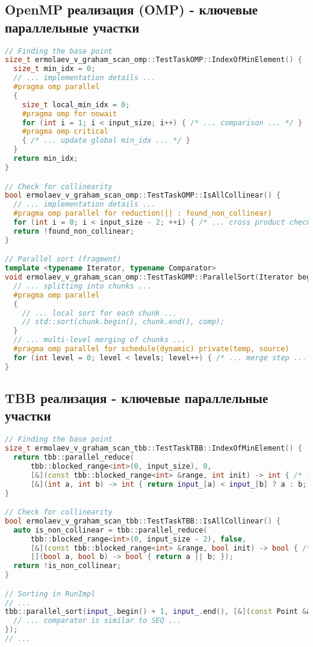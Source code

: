 \documentclass[12pt]{article}
\begin{document}
\subsection{OpenMP реализация (OMP) - ключевые параллельные участки}
\begin{lstlisting}[language=C++]
// Finding the base point
size_t ermolaev_v_graham_scan_omp::TestTaskOMP::IndexOfMinElement() {
  size_t min_idx = 0;
  // ... implementation details ...
  #pragma omp parallel
  {
    size_t local_min_idx = 0;
    #pragma omp for nowait
    for (int i = 1; i < input_size; i++) { /* ... comparison ... */ }
    #pragma omp critical
    { /* ... update global min_idx ... */ }
  }
  return min_idx;
}

// Check for collinearity
bool ermolaev_v_graham_scan_omp::TestTaskOMP::IsAllCollinear() {
  // ... implementation details ...
  #pragma omp parallel for reduction(|| : found_non_collinear)
  for (int i = 0; i < input_size - 2; ++i) { /* ... cross product check ... */ }
  return !found_non_collinear;
}

// Parallel sort (fragment)
template <typename Iterator, typename Comparator>
void ermolaev_v_graham_scan_omp::TestTaskOMP::ParallelSort(Iterator begin, Iterator end, Comparator comp) {
  // ... splitting into chunks ...
  #pragma omp parallel
  {
    // ... local sort for each chunk ...
    // std::sort(chunk.begin(), chunk.end(), comp);
  }
  // ... multi-level merging of chunks ...
  #pragma omp parallel for schedule(dynamic) private(temp, source)
  for (int level = 0; level < levels; level++) { /* ... merge step ... */ }
}
\end{lstlisting}
\newpage

\subsection{TBB реализация - ключевые параллельные участки}
\begin{lstlisting}[language=C++]
// Finding the base point
size_t ermolaev_v_graham_scan_tbb::TestTaskTBB::IndexOfMinElement() {
  return tbb::parallel_reduce(
      tbb::blocked_range<int>(0, input_size), 0,
      [&](const tbb::blocked_range<int> &range, int init) -> int { /* ... local min finding ... */ },
      [&](int a, int b) -> int { return input_[a] < input_[b] ? a : b; });
}

// Check for collinearity
bool ermolaev_v_graham_scan_tbb::TestTaskTBB::IsAllCollinear() {
  auto is_non_collinear = tbb::parallel_reduce(
      tbb::blocked_range<int>(0, input_size - 2), false,
      [&](const tbb::blocked_range<int> &range, bool init) -> bool { /* ... non-collinear check ... */ },
      [](bool a, bool b) -> bool { return a || b; });
  return !is_non_collinear;
}

// Sorting in RunImpl
// ...
tbb::parallel_sort(input_.begin() + 1, input_.end(), [&](const Point &a, const Point &b) {
  // ... comparator is similar to SEQ ...
});
// ...
\end{lstlisting}
\newpage
\end{document}

